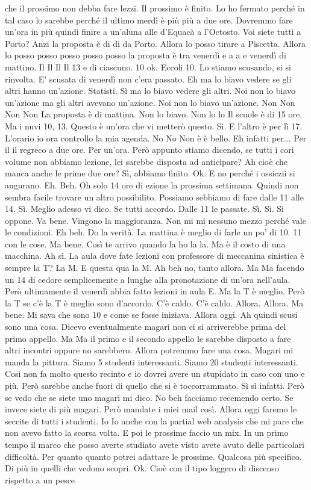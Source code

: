 \begin{soluzione}
    che il prossimo non debba fare lezzi. Il prossimo è finito. Lo ho fermato perché in tal caso lo sarebbe perché il ultimo merdì è più più a due ore. Dovremmo fare un'ora in più quindi finire a un'aluna alle d'Equacà a l'Octosto. Voi siete tutti a Porto? Anzi la proposta è di di da Porto. Allora lo posso tirare a Piscetta. Allora lo posso posso posso posso posso la proposta è tra venerdì e a a e venerdì di mattino. Il Il Il Il 13 e di ciascuno. 10 ok. Eccoli 10. Lo stiamo scusando, si si rinvolta. E' scusata di venerdì non c'era passato. Eh ma lo biavo vedere se gli altri hanno un'azione. Statisti. Sì ma lo biavo vedere gli altri. Noi non lo biavo un'azione ma gli altri avevano un'azione. Noi non lo biavo un'azione. Non Non Non Non La proposta è di mattina. Non lo biavo. Non lo lo Il scuole è di 15 ore. Ma i nuvi 10, 13. Questo è un'ora che vi metterò questo. Sì. E l'altro è per lì 17. L'orario io ora controllo la mia agenda. No No Non è è bello. Eh infatti per... Per il il regreco a due ore. Per un'ora. Però appunto stiamo dicendo, se tutti i cori volume non abbiamo lezione, lei sarebbe disposta ad anticipare? Ah cioè che manca anche le prime due ore? Sì, abbiamo finito. Ok. E no perché i ossiczii si augurano. Eh. Beh. Oh solo 14 ore di ezione la prossima settimana. Quindi non sembra facile trovare un altro possibilito. Possiamo sebbiamo di fare dalle 11 alle 14. Sì. Meglio adesso vi dico. Se tutti accordo. Dalle 11 le passate. Sì. Si. Si oppone. Va bene. Vingono la maggioranza. Non mi mi nessuno mezzo perché vale le condizioni. Eh beh. Do la verità. La mattina è meglio di farle un po' di 10. 11 con le cose. Ma bene. Così te arrivo quando la ho la la. Ma è il costo di una macchina. Ah sì. La aula dove fate lezioni con professore di meccanina sinistica è sempre la T? La M. E questa qua la M. Ah beh no, tanto allora. Ma Ma facendo un 14 di cedore semplicemente a lunghe alla pronotazione di un'ora nell'aula. Però ultimamente il venerdì abbia fatto lezioni in aula E. Ma la T è meglio. Però la T se c'è la T è meglio sono d'accordo. C'è caldo. C'è caldo. Allora. Allora. Ma bene. Mi sava che sono 10 e come se fosse iniziava. Allora oggi. Ah quindi scusi sono una cosa. Dicevo eventualmente magari non ci si arriverebbe prima del primo appello. Ma Ma il primo e il secondo appello le sarebbe disposto a fare altri incontri oppure no sarebbero. Allora potremmo fare una cosa. Magari mi manda la pittura. Siamo 5 studenti interessanti. Siamo 20 studenti interessanti. Così non fa molto questo recinto e io dovrei avere un stupidato in caso con uno e più. Però sarebbe anche fuori di quello che si è toccorrammato. Sì sì infatti. Però se vedo che se siete uno magari mi dico. No beh facciamo recemendo certo. Se invece siete di più magari. Però mandate i miei mail così. Allora oggi faremo le seccite di tutti i studenti. Io Io anche con la partial web analysis che mi pare che non avevo fatto la scorsa volta. E poi le prossime faccio un mix. In un primo tempo il marco che posso averte studiato avete visto avete avuto delle particolari difficoltà. Per quanto quanto potrei adattare le prossime. Qualcosa più specifico. Di più in quelli che vedono scopri. Ok. Cioè con il tipo loggero di discenso rispetto a un pesce 
\end{soluzione}
